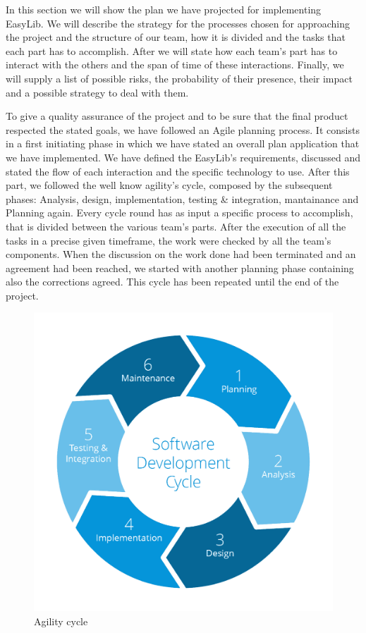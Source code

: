 \vspace*{-5mm}
In this section we will show the plan we have projected for implementing EasyLib. We will describe the strategy for the processes chosen for approaching the project and the structure of our team, how it is divided and the tasks that each part has to accomplish. After we will state how each team’s part has to interact with the others and the span of time of these interactions. Finally, we will supply a list of possible risks, the probability of their presence, their impact and a possible strategy to deal with them.

To give a quality assurance of the project and to be sure that the final product respected the stated goals, we have followed an Agile planning process. It consists in a first initiating phase in which we have stated an overall plan application that we have implemented. We have defined the EasyLib’s requirements, discussed and stated the flow of each interaction and the specific technology to use. 
After this part, we followed the well know agility’s cycle, composed by the subsequent phases: Analysis, design, implementation, testing \& integration, mantainance and Planning again. Every cycle round has as input a specific process to accomplish, that is divided between the various team’s parts. After the execution of all the tasks in a precise given timeframe, the work were checked by all the team's components. When the discussion on the work done had been terminated and an agreement had been reached, we started with another planning phase containing also the corrections agreed. This cycle has been repeated until the end of the project.

\vspace*{0cm}
\begin{figure}[H]
	\centering
	\includegraphics[scale=0.21]{Images/Diagrams/agility_cycle}
	\caption{Agility cycle}
\end{figure}

